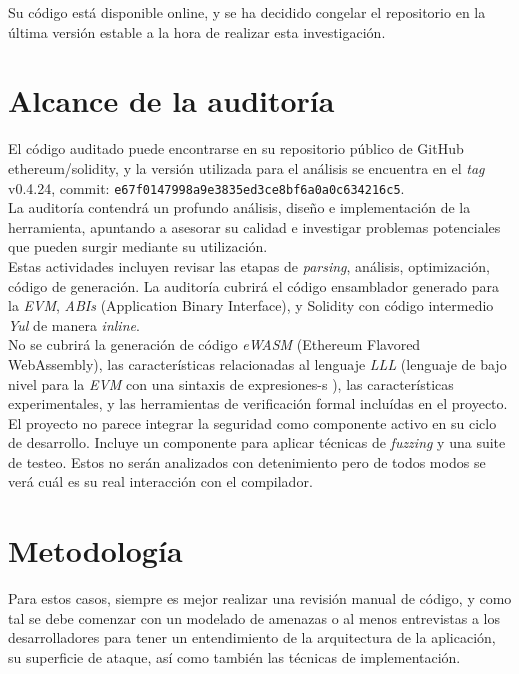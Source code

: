 Su código está disponible online, y se ha decidido congelar el repositorio en la última versión estable a la hora de realizar esta investigación.


\section{Alcance de la auditoría}

El código auditado puede encontrarse en su repositorio público de GitHub ethereum/solidity\cite{SolidityGitHub}, y la versión utilizada para el análisis se encuentra en el \textit{tag} v0.4.24\cite{SolidityGitHub0424}, commit: \texttt{e67f0147998a9e3835ed3ce8bf6a0a0c634216c5}.\\

La auditoría contendrá un profundo análisis, diseño e implementación de la herramienta, apuntando a asesorar su calidad e investigar problemas potenciales que pueden surgir mediante su utilización.\\

Estas actividades incluyen revisar las etapas de \textit{parsing}, análisis, optimización, código de generación. La auditoría cubrirá el código ensamblador generado para la \textit{EVM}, \textit{ABIs} (Application Binary Interface), y Solidity con código intermedio \textit{Yul} de manera \textit{inline}.\\

No se cubrirá la generación de código \textit{eWASM} (Ethereum Flavored WebAssembly), las características relacionadas al lenguaje \textit{LLL} (lenguaje de bajo nivel para la \textit{EVM} con una sintaxis de expresiones-s ), las características experimentales, y las herramientas de verificación formal incluídas en el proyecto.\\

El proyecto no parece integrar la seguridad como componente activo en su ciclo de desarrollo. Incluye un componente para aplicar técnicas de \textit{fuzzing} y una suite de testeo. Estos no serán analizados con detenimiento pero de todos modos se verá cuál es su real interacción con el compilador.

\section{Metodología }
Para estos casos, siempre es mejor realizar una revisión manual de código, y como tal se debe comenzar con un modelado de amenazas o al menos entrevistas a los desarrolladores para tener un entendimiento de la arquitectura de la aplicación, su superficie de ataque, así como también las técnicas de implementación.\\

